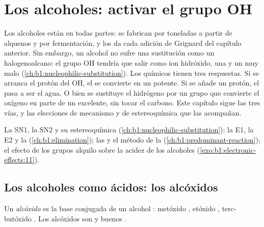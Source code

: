 \chapter{Los alcoholes: activar el grupo OH}\label{ch:b1:alcohol-activation}

Los alcoholes están en todas partes: se fabrican por toneladas a partir
de alquenos y por fermentación, y los da cada adición de Grignard del
capítulo anterior. Sin embargo, un alcohol no sufre una sustitución como
un halogenoalcano: el grupo OH tendría que salir como ion hidróxido, una
 y un  muy malo
(\cref{ch:b1:nucleophilic-substitution}). Los químicos tienen tres
respuestas. Si se arranca el protón del OH, el  se convierte en
un  potente. Si se añade un protón, el  pasa a
ser el agua. O bien se sustituye el hidrógeno por un grupo que convierte
el oxígeno en parte de un  excelente, sin tocar el carbono.
Este capítulo sigue las tres vías, y las elecciones de mecanismo y de
estereoquímica que las acompañan.

\begin{recall}
La SN1, la SN2 y su estereoquímica (\cref{ch:b1:nucleophilic-substitution});
la E1, la E2 y la  (\cref{ch:b1:elimination}); las
 y el método de la 
(\cref{ch:b1:predominant-reaction}); el efecto de los grupos alquilo sobre
la acidez de los alcoholes
(\cref{exo:b1:electronic-effects:11}).
\end{recall}

\section{Los alcoholes como ácidos: los alcóxidos}

\begin{definition}[Alcóxido]\label{def:b1:alcohol-activation:alkoxide}
Un \emph{alcóxido} es la base conjugada  de un alcohol
: metóxido , etóxido , terc-butóxido
. Los alcóxidos son  y buenos .
\end{definition}

